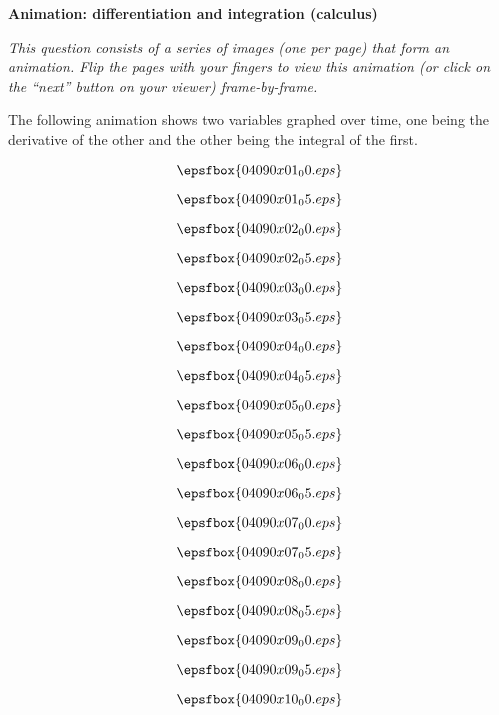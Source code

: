 

\centerline{\bf Animation: differentiation and integration (calculus)}

\vskip 10pt

{\it This question consists of a series of images (one per page) that form an animation.  Flip the pages with your fingers to view this animation (or click on the ``next'' button on your viewer) frame-by-frame.}

\vskip 10pt

The following animation shows two variables graphed over time, one being the derivative of the other and the other being the integral of the first.


\vfil \eject
$$\epsfbox{04090x01_00.eps}$$

\vfil \eject
$$\epsfbox{04090x01_05.eps}$$

\vfil \eject
$$\epsfbox{04090x02_00.eps}$$

\vfil \eject
$$\epsfbox{04090x02_05.eps}$$

\vfil \eject
$$\epsfbox{04090x03_00.eps}$$

\vfil \eject
$$\epsfbox{04090x03_05.eps}$$

\vfil \eject
$$\epsfbox{04090x04_00.eps}$$

\vfil \eject
$$\epsfbox{04090x04_05.eps}$$

\vfil \eject
$$\epsfbox{04090x05_00.eps}$$

\vfil \eject
$$\epsfbox{04090x05_05.eps}$$

\vfil \eject
$$\epsfbox{04090x06_00.eps}$$

\vfil \eject
$$\epsfbox{04090x06_05.eps}$$

\vfil \eject
$$\epsfbox{04090x07_00.eps}$$

\vfil \eject
$$\epsfbox{04090x07_05.eps}$$

\vfil \eject
$$\epsfbox{04090x08_00.eps}$$

\vfil \eject
$$\epsfbox{04090x08_05.eps}$$

\vfil \eject
$$\epsfbox{04090x09_00.eps}$$

\vfil \eject
$$\epsfbox{04090x09_05.eps}$$

\vfil \eject
$$\epsfbox{04090x10_00.eps}$$

